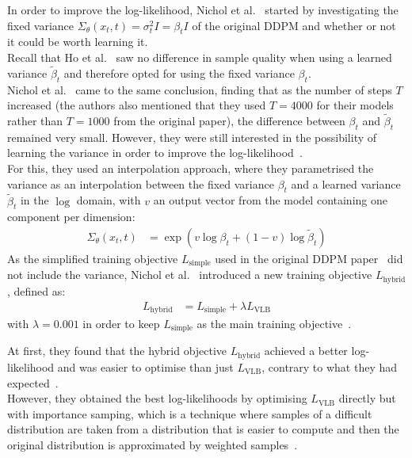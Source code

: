 \documentclass[twoside]{article}
\numberwithin{equation}{section}
\numberwithin{figure}{section}
\begin{document}
In order to improve the log-likelihood, Nichol et al.~\cite{nichol2021improved} started by investigating the fixed variance $\Sigma_\theta (x_t, t) = \sigma_t^2 I = \beta_t I$ of the original DDPM and whether or not it could be worth learning it. \\
Recall that Ho et al.~\cite{ho2020denoising} saw no difference in sample quality when using a learned variance $\tilde{\beta}_t$ and therefore opted for using the fixed variance $\beta_t$. \\
Nichol et al.~\cite{nichol2021improved} came to the same conclusion, finding that as the number of steps $T$ increased (the authors also mentioned that they used $T = 4000$ for their models rather than $T = 1000$ from the original paper), the difference between $\beta_t$ and $\tilde{\beta}_t$ remained very small. However, they were still interested in the possibility of learning the variance in order to improve the log-likelihood~\cite{nichol2021improved}. \\
For this, they used an interpolation approach, where they parametrised the variance as an interpolation between the fixed variance $\beta_t$ and a learned variance $\tilde{\beta}_t$ in the $\log$ domain, with $v$ an output vector from the model containing one component per dimension:
\begin{align}
  \Sigma_\theta (x_t, t) &= \exp \left( v \log \beta_t + (1 - v) \log \tilde{\beta}_t \right)
\end{align}
As the simplified training objective $L_{\text{simple}}$ used in the original DDPM paper~\cite{ho2020denoising} did not include the variance, Nichol et al.~\cite{nichol2021improved} introduced a new training objective $L_{\text{hybrid}}$, defined as:
\begin{align}
  L_{\text{hybrid}} &= L_{\text{simple}} + \lambda L_{\text{VLB}}
\end{align}
with $\lambda = 0.001$ in order to keep $L_{\text{simple}}$ as the main training objective~\cite{nichol2021improved}.

At first, they found that the hybrid objective $L_{\text{hybrid}}$ achieved a better log-likelihood and was easier to optimise than just $L_{\text{VLB}}$, contrary to what they had expected~\cite{nichol2021improved}. \\
However, they obtained the best log-likelihoods by optimising $L_{\text{VLB}}$ directly but with importance samping, which is a technique where samples of a difficult distribution are taken from a distribution that is easier to compute and then the original distribution is approximated by weighted samples~\cite{nichol2021improved}.
\end{document}

